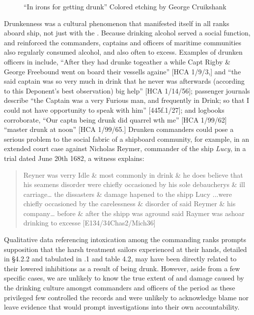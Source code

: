  
\begin{figure}


\caption{\label{fig:key:4.4} “In irons for getting drunk” Colored etching by George Cruikshank}
\end{figure}

Drunkenness was a cultural phenomenon that manifested itself in all ranks aboard ship, not just with the . Because drinking alcohol served a social function, and reinforced  \citep[13,]{Fury2015} the commanders, captains and officers of maritime communities also regularly consumed alcohol, and also often to excess. Examples of drunken officers in  include, “After they had drunke togeather a while Capt Rigby \& George Freebound went on board their vessells againe” [HCA 1/9/3,] and “the said captain was so very much in drink that he never was afterwards (according to this Deponent’s best observation) big help” [HCA 1/14/56]; passenger journals describe “the Captain was a very Furious man, and frequently in Drink; so that I could not have opportunity to speak with him” [445f.1/27]; and logbooks corroborate, “Our captn being drunk did quarrel wth me” [HCA 1/99/62] “master drunk at noon” [HCA 1/99/65.] Drunken commanders could pose a serious problem to the social fabric of a shipboard community, for example, in an extended court case against Nicholas Reymer, commander of the ship \textit{Lucy}, in a trial dated June 20th 1682, a witness explains:

\begin{quotation}
Reyner was verry Idle \& most commonly in drink \& he does believe that his seamens disorder were chiefly occasioned by his sole debaucherys \& ill carriage… the dissasters \& damage hapened to the shipp Lucy ...were chiefly occasioned by the carelessness \& disorder of said Reymer \& his company… before \& after the shipp was aground said Raymer was ashoar drinking to excesse  [E134/34Chas2/Mich36]
\end{quotation}

Qualitative data referencing intoxication among the commanding ranks prompts supposition that the harsh treatment sailors experienced at their hands, detailed in §4.2.2 and tabulated in .1 and table 4.2, may have been directly related to their lowered inhibitions as a result of being drunk. However, aside from a few specific cases, we are unlikely to know the true extent of and damage caused by the drinking culture amongst commanders and officers of the period as these privileged few controlled the records and were unlikely to acknowledge blame nor leave evidence that would prompt investigations into their own accountability.

